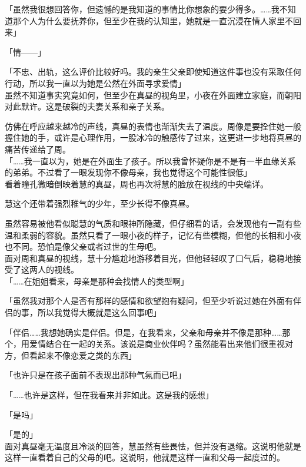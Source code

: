 「虽然我很想回答你，但遗憾的是我知道的事情比你想象的要少得多。……我不知道那个人为什么要抚养你，但至少在我的认知里，她就是一直沉浸在情人家里不回来」

「情——」

「不忠、出轨，这么评价比较好吗。我的亲生父亲即使知道这件事也没有采取任何行动，所以我一直以为她是公然在外面寻求爱情」\\

虽然不知道事实究竟如何，但至少在真昼的视角里，小夜在外面建立家庭，而朝阳对此默许。这是破裂的夫妻关系和亲子关系。

仿佛在呼应越来越冷的声线，真昼的表情也渐渐失去了温度。周像是要拴住她一般握住她的手，或许是心理作用，一股冰冷的触感传了过来，这更进一步地将真昼的痛苦传递给了周。\\

「……我一直以为，她是在外面生了孩子。所以我曾怀疑你是不是有一半血缘关系的弟弟。不过看了一眼发现你不像母亲，我也觉得这个可能性很低」\\

看着瞳孔微暗倒映着慧的真昼，周也再次将慧的脸放在视线的中央端详。

慧这个还带着强烈稚气的少年，至少长得不像真昼。

虽然容易被他看似聪慧的气质和眼神所隐藏，但仔细看的话，会发现他有一副有些温和柔弱的容貌。虽然只看了一眼小夜的样子，记忆有些模糊，但他的长相和小夜也不同。恐怕是像父亲或者过世的生母吧。\\

面对周和真昼的视线，慧十分尴尬地游移着目光，但他轻轻叹了口气后，稳稳地接受了这两人的视线。\\

「……在姐姐看来，母亲是那种会找情人的类型啊」

「虽然我对那个人是否有那样的感情和欲望抱有疑问，但至少听说过她在外面有伴侣的事，所以我觉得大概就是这么回事吧」

「伴侣……我想她确实是伴侣。但是，在我看来，父亲和母亲并不像是那种……那个，用爱情结合在一起的关系。该说是商业伙伴吗？虽然能看出来他们很重视对方，但看起来不像恋爱之类的东西」

「也许只是在孩子面前不表现出那种气氛而已吧」

「……也许是这样，但在我看来并非如此。这是我的感想」

「是吗」

「是的」\\

面对真昼毫无温度且冷淡的回答，慧虽然有些畏怯，但并没有退缩。这说明他就是这样一直看着自己的父母的吧。这说明，他就是这样一直和父母一起度过的。\\


